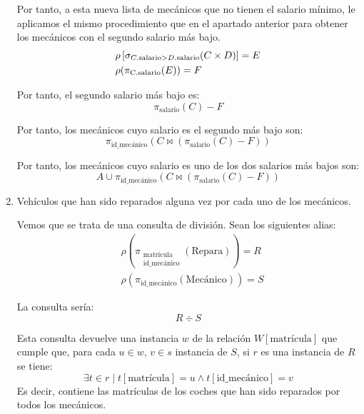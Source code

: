 \begin{ejercicio}
\begin{enumerate}
        Por tanto, a esta nueva lista de mecánicos que no tienen el salario mínimo, le aplicamos el mismo procedimiento que en el apartado anterior para obtener 
        los mecánicos con el segundo salario más bajo.
        \begin{align*}
            & \rho\left[\sigma_{C.\text{salario} > D.\text{salario}}(C \times D)\right] = E\\
            & \rho(\pi_{\text{C.\text{salario}}}(E)) = F
        \end{align*}

        Por tanto, el segundo salario más bajo es:
        \begin{equation*}
            \pi_{\text{salario}}(C)-F
        \end{equation*}

        Por tanto, los mecánicos cuyo salario es el segundo más bajo son:
        \begin{equation*}
            \pi_{\text{id\_mecánico}}(C\bowtie (\pi_{\text{salario}}(C)-F))
        \end{equation*}

        Por tanto, los mecánicos cuyo salario es uno de los dos salarios más bajos son:
        \begin{equation*}
            A\cup \pi_{\text{id\_mecánico}}(C\bowtie (\pi_{\text{salario}}(C)-F))
        \end{equation*}

        \item Vehículos que han sido reparados alguna vez por cada uno de los mecánicos.
        
        Vemos que se trata de una consulta de división.
        Sean los siguientes alias:
        \begin{align*}
            & \rho\left(\pi_{\substack{\text{matrícula}\\\text{id\_mecánico}}}(\text{Repara})\right) = R\\
            & \rho(\pi_{\text{id\_mecánico}}(\text{Mecánico})) = S
        \end{align*}

        La consulta sería:
        \begin{equation*}
            R \div S
        \end{equation*}

        Esta consulta devuelve una instancia $w$ de la relación $W[\text{matrícula}]$ que cumple que,
        para cada $u\in w$, $v\in s$ instancia de $S$, si $r$ es una instancia de $R$ se tiene:
        \begin{equation*}
            \exists t\in r\mid t[\text{matrícula}] = u \land t[\text{id\_mecánico}] = v
        \end{equation*}
        Es decir, contiene las matrículas de los coches que han sido reparados por todos los mecánicos.
        


\end{enumerate}
\end{ejercicio}

